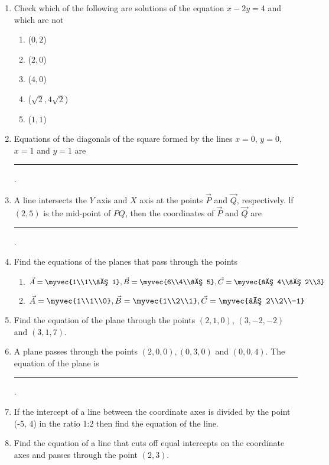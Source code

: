 \begin{enumerate}[label=\thesubsection.\arabic*, ref=\thesubsection.\theenumi]
\label{chapters/11/10/2/5}
\\
\solution 

\item Check which of the following are solutions of the equation $x-2y=4$ and which 
are not
\begin{enumerate}
\item ($0, 2$)
\item ($2, 0$)
\item ($4, 0$)
\item ($\sqrt 2,  4\sqrt 2$)
\item ($1, 1$)
\end{enumerate}
\item Equations of the diagonals of the square formed by the lines $x=0$,  $y=0$,  $x=1$ and $y=1$ are \rule{1cm}{0.1pt}.
\item A line intersects the $Y$ axis and $X$ axis at the points $\vec{P}$  and $\vec{Q}$,  respectively. lf $(2, 5)$ is the mid-point of $PQ$,  then the coordinates of $\vec{P}$ and $ \vec{Q}$ are \rule{1cm}{0.1pt}.
	\item Find the equations of the planes that pass through the points
\begin{enumerate}
\item $\vec{A}= \myvec{1\\1\\– 1},  \vec{B}=\myvec{6\\4\\– 5}, \vec{C}= \myvec{– 4\\– 2\\3}$
\item $\vec{A}= \myvec{1\\1\\0},  \vec{B}= \myvec{1\\2\\1},  \vec{C}= \myvec{– 2\\2\\-1}$
\end{enumerate}
    \solution
		
\item Find the equation of the plane through the points $(2, 1, 0)$,  $(3, -2, -2)$ and $(3, 1, 7)$.
\item A plane passes through the points $(2, 0, 0),  (0, 3, 0)$ and $(0, 0, 4)$. The equation of the plane is \noindent\rule{1cm}{0.1pt}.
\item If the intercept of a line between the coordinate axes is divided by the point (-5, 4) in the ratio 1:2 then find the equation of the line.
\item Find the equation of a line that cuts off equal intercepts on the coordinate axes and passes through the point $(2, 3)$.  

\end{enumerate}
